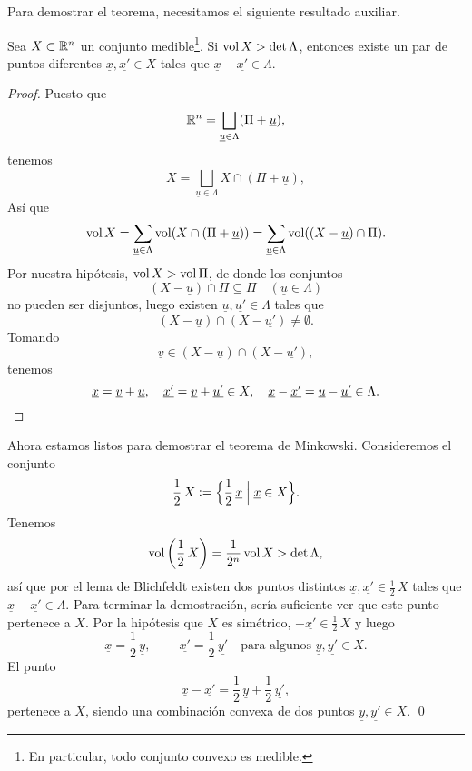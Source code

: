 \documentclass{article}
\numberwithin{equation}{section}
\begin{document}
Para demostrar el teorema, necesitamos el siguiente resultado auxiliar.

\begin{lema*}[Blichfeldt]
  Sea $X\subset \mathbb{R}^n$ un conjunto
  medible\footnote{En particular, todo conjunto convexo es medible.}.
  Si $\operatorname{vol} X > \det \Lambda$, entonces existe un par de puntos diferentes
  $\underline{x},\underline{x'}\in X$ tales que
  $\underline{x}-\underline{x'}\in \Lambda$.

  \begin{proof}
    Puesto que
    $$\mathbb{R}^n = \bigsqcup_{\underline{u}\in \Lambda} (\Pi + \underline{u}),$$
    tenemos
    $$X = \bigsqcup_{\underline{u}\in \Lambda} X \cap (\Pi + \underline{u}),$$
    Así que
    $$\operatorname{vol} X = \sum_{\underline{u}\in \Lambda} \operatorname{vol} (X \cap (\Pi + \underline{u})) = \sum_{\underline{u}\in \Lambda} \operatorname{vol} ((X-\underline{u}) \cap \Pi).$$
    Por nuestra hipótesis, $\operatorname{vol} X > \operatorname{vol} \Pi$, de donde los conjuntos
    $$(X-\underline{u}) \cap \Pi \subseteq \Pi \quad (\underline{u}\in\Lambda)$$
    no pueden ser disjuntos, luego existen
    $\underline{u}, \underline{u'}\in \Lambda$ tales que
    $$(X-\underline{u}) \cap (X-\underline{u'}) \ne \emptyset.$$
    Tomando
    $$\underline{v} \in (X-\underline{u}) \cap (X-\underline{u'}),$$
    tenemos
    \[ \underline{x} = \underline{v} + \underline{u}, \quad \underline{x'} =
      \underline{v} + \underline{u'} \in X, \quad \underline{x}-\underline{x'} =
      \underline{u}-\underline{u'} \in \Lambda. \qedhere \]
  \end{proof}
\end{lema*}

Ahora estamos listos para demostrar el teorema de Minkowski. Consideremos el
conjunto
$$\frac{1}{2}\,X \mathrel{\mathop:}= \Bigl\{ \frac{1}{2}\,\underline{x} \Bigm| \underline{x} \in X \Bigr\}.$$
Tenemos
$$\operatorname{vol} \left(\frac{1}{2}\,X\right) = \frac{1}{2^n} \operatorname{vol} X > \det \Lambda,$$
así que por el lema de Blichfeldt existen dos puntos distintos
$\underline{x},\underline{x'} \in \frac{1}{2}\,X$ tales que
$\underline{x}-\underline{x'} \in \Lambda$. Para terminar la demostración, sería
suficiente ver que este punto pertenece a $X$. Por la hipótesis que $X$ es
simétrico, $-\underline{x'}\in \frac{1}{2}\,X$ y luego
$$\underline{x} = \frac{1}{2}\,\underline{y}, \quad -\underline{x'} = \frac{1}{2}\,\underline{y'} \quad\text{para algunos }\underline{y},\underline{y'}\in X.$$
El punto
$$\underline{x} - \underline{x'} = \frac{1}{2}\,\underline{y} + \frac{1}{2}\,\underline{y'},$$
pertenece a $X$, siendo una combinación convexa de dos puntos
$\underline{y},\underline{y'}\in X$. \qed
\end{document}

